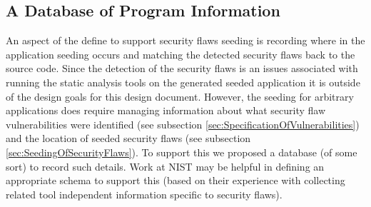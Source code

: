 \subsection{A Database of Program Information}
         \label{sec:SpecificationOfDatabase}
         An aspect of the define to support security flaws seeding is recording
where in the application seeding occurs and matching the detected security flaws
back to the source code. Since the detection of the security flaws is an issues 
associated with running the static analysis tools on the generated seeded application
it is outside of the design goals for this design document.  However, the seeding
for arbitrary applications does require managing information about what security flaw
vulnerabilities were identified (see subsection \ref{sec:SpecificationOfVulnerabilities}) 
and the location of seeded security flaws (see subsection \ref{sec:SeedingOfSecurityFlaws}).
To support this we proposed a database (of some sort) to record such
details.  Work at NIST may be helpful in defining an appropriate schema to support this
(based on their experience with collecting related tool independent information specific
to security flaws).

